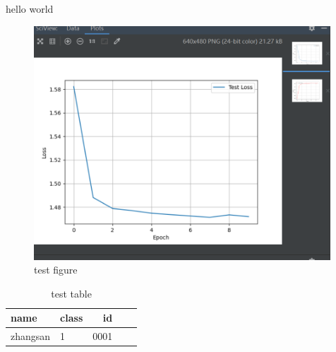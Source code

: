 \documentclass[journal]{IEEEtran}
\begin{document}
hello world
\cite{donahue2015long}



\begin{figure}
\centering
\includegraphics[width=30em]{result1.png}
\caption{test figure}
\end{figure}




\begin{table}
\centering
\caption{test table}
\begin{tabular}{p{15.1em}|lr|lr}
\hline
name & class &id\\
\hline
zhangsan & 1 & 0001\\
\hline

\end{tabular}

\end{table}

\end{document}
